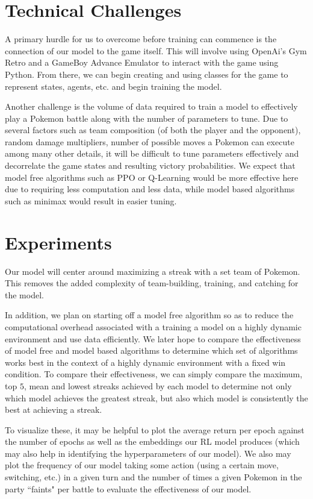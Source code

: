 \documentclass[10pt,twocolumn,letterpaper]{article}
\begin{document}
\section{Technical Challenges}

A primary hurdle for us to overcome before training can commence is the connection of our model to
the game itself. This will involve using OpenAi's Gym Retro and a GameBoy Advance Emulator to interact
with the game using Python. From there, we can begin creating and using classes for the game
to represent states, agents, etc. and begin training the model. 

Another challenge is the volume of data required to train a model to effectively play a Pokemon battle along with the number of parameters to tune. Due to several factors such as team composition (of both the player and the opponent), random damage multipliers, number of possible moves a Pokemon can execute among many other details, it will be difficult to tune parameters effectively and decorrelate the game states and resulting victory probabilities. We expect that model free algorithms such as PPO or Q-Learning would be more effective here due to requiring less computation and less data, while model based algorithms such as minimax would result in easier tuning. 

\section{Experiments}

Our model will center around maximizing a streak with a set team of Pokemon. This removes the added complexity of team-building, training, and catching for the model. 

In addition, we plan on starting off a model free algorithm so as to reduce the computational overhead associated with a training a model on a highly dynamic environment and use data efficiently. We later hope to compare the effectiveness of model free and model based algorithms to determine which set of algorithms works best in the context of a highly dynamic environment with a fixed win condition. To compare their effectiveness, we can simply compare the maximum, top $5$, mean and lowest streaks achieved by each model to determine not only which model achieves the greatest streak, but also which model is consistently the best at achieving a streak. 

To visualize these, it may be helpful to plot the average return per epoch against the number of epochs as well as the embeddings our RL model produces (which may also help in identifying the hyperparameters of our model). We also may plot the frequency of our model taking some action (using a certain move, switching, etc.) in a given turn and the number of times a given Pokemon in the party ``faints" per battle to evaluate the effectiveness of our model.
\end{document}
